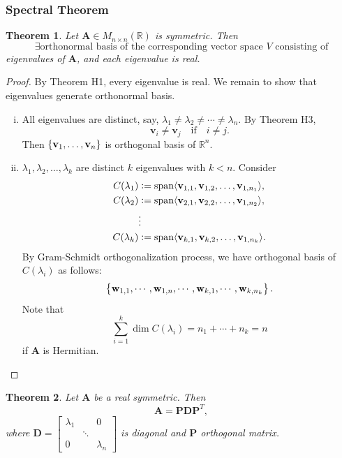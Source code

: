 \documentclass[12pt,openany]{book}
\newtheorem{theorem}{Theorem}[chapter]
\theoremstyle{definition}
\newcommand{\R}{\mathbb{R}}
\newcommand{\by}{\times}
\newcommand{\Span}[1]{\textnormal{span}\langle #1\rangle}
\renewcommand{\vec}[1]{\textbf{#1}}
\begin{document}
	\subsubsection{Spectral Theorem}
	\begin{tcolorbox}[colframe=thmcolor,title={\color{white}\bf Spectral Theorem}]
		\begin{theorem}
			Let \(\textbf{A}\in M_{n\by n}(\R)\) is symmetric. Then \[
			\exists\text{orthonormal basis of the corresponding vector space $V$ consisting of}
			\] eigenvalues of \(\textbf{A}\), and each eigenvalue is real.
		\end{theorem}
	\end{tcolorbox}
	\begin{proof}
	By Theorem H1, every eigenvalue is real. We remain to show that eigenvalues generate orthonormal basis.
	\begin{enumerate}[(i)]
		\item All eigenvalues are distinct, say, \(\lambda_1\neq\lambda_2\neq\cdots\neq\lambda_n\). By Theorem H3, \[
		\vec{v}_i\neq\vec{v}_j\quad\text{if}\quad i\neq j.
		\] Then \(\set{\vec{v}_1,\dots,\vec{v}_n}\) is orthogonal basis of \(\R^n\).
		\item \(\lambda_1,\lambda_2,\dots,\lambda_k\) are distinct \(k\) eigenvalues with \(k<n\). Consider \begin{align*}
			C(\lambda_1)&:=\Span{\vec{v}_{1,1},\vec{v}_{1,2},\dots,\vec{v}_{1,n_1}},\\
			C(\lambda_2)&:=\Span{\vec{v}_{2,1},\vec{v}_{2,2},\dots,\vec{v}_{1,n_2}},\\
			&\vdots\\
			C(\lambda_k)&:=\Span{\vec{v}_{k,1},\vec{v}_{k,2},\dots,\vec{v}_{1,n_k}}.
		\end{align*} By Gram-Schmidt orthogonalization process, we have orthogonal basis of \(C(\lambda_i)\) as follows:
		\[
		\set{\textbf{w}_{1,1},\cdots,\vec{w}_{1,n},\cdots,\textbf{w}_{k,1},\cdots,\vec{w}_{k,n_k}}.
		\] Note that \[
		\sum_{i=1}^k\dim C(\lambda_i)=n_1+\cdots+n_k=n
		\] if \textbf{A} is Hermitian.
	\end{enumerate}
	\end{proof}
	\vspace{4pt}
	\newpage
	\begin{tcolorbox}[colframe=thmcolor,title={\color{white}\bf Spectral Decomposition}]
		\begin{theorem}
			Let \(\textbf{A}\) be a real symmetric. Then \[
			\textbf{A}=\textbf{P}\textbf{D}\textbf{P}^T,
			\] where $\textbf{D}=\begin{bmatrix}
				\lambda_1 &&0\\ &\ddots&\\0&&\lambda_n
			\end{bmatrix}$ is diagonal and \(\textbf{P}\) orthogonal matrix.
		\end{theorem}
	\end{tcolorbox}
\end{document}
